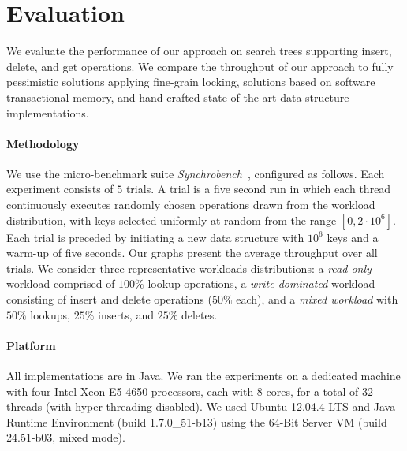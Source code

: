 \section{Evaluation}
\label{sec:eval}

We evaluate the performance of our approach on 
search trees supporting insert, delete, and get operations. 
We compare the throughput of our approach to fully pessimistic solutions applying fine-grain locking, solutions based on software transactional memory, and hand-crafted state-of-the-art data structure
implementations.

\paragraph{Methodology} We use the micro-benchmark suite \textit{Synchrobench}~\cite{Gramoli2015}, configured as follows. 
Each experiment
consists of $5$ trials. A trial is a five second run in which each thread continuously executes
randomly chosen operations drawn from the workload distribution, with keys
selected uniformly at random from the range $[0,2\cdot10^6]$.
Each trial is preceded by initiating a new data structure with
$10^6$ keys and a warm-up of five seconds.  Our graphs present the average throughput over all trials.
We consider three representative workloads distributions: a
\emph{read-only} workload comprised of $100\%$ lookup operations, a \emph{write-dominated}
workload consisting of insert and delete operations ($50\%$ each), and a
\emph{mixed workload} with $50\%$ lookups, $25\%$ inserts, and $25\%$
deletes.

\paragraph{Platform} All implementations are in Java. We ran the experiments on a dedicated machine with
four Intel Xeon E5-4650 processors, each with $8$ cores, for a total of $32$ threads
(with hyper-threading disabled).
We used Ubuntu 12.04.4 LTS and Java Runtime Environment (build
1.7.0\_51-b13) using the 64-Bit Server VM (build 24.51-b03, mixed mode).


